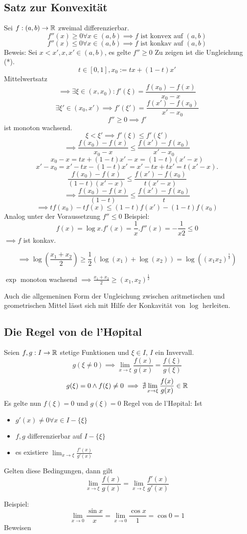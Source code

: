 \documentclass[a4paper]{article}
\begin{document}
\subsection*{Satz zur Konvexität}
Sei $f: (a, b) \to \Bbb R$ zweimal differenzierbar.
$$f''(x) \geq 0 \forall x \in (a, b) \implies f \text{ ist konvex auf } (a, b)$$
$$f''(x) \leq 0 \forall x \in (a, b) \implies f \text{ ist konkav auf } (a, b)$$
Beweis: Sei $x< x', x, x' \in (a, b)$, es gelte $f'' \geq 0$
Zu zeigen ist die Ungleichung (*).
$$t \in [0, 1], x_0 := tx + (1-t)x'$$
Mittelwertsatz
$$\implies \exists \xi \in (x, x_0) : f'(\xi) = \frac{f(x_0) - f(x)}{x_0 - x}$$
$$\exists \xi' \in (x_0, x') \implies f'(\xi') = \frac{f(x') - f(x_0)}{x' - x_0}$$
$$f'' \geq 0 \implies f'$$ ist monoton wachsend.
$$\xi < \xi' \implies f'(\xi) \leq f'(\xi')$$
$$ \implies \frac{f(x_0) - f(x)}{x_0 - x} \leq \frac{f(x') - f(x_0)}{x' - x_0}$$
$$ x_0 - x = tx + (1-t)x' - x = (1-t)(x'-x)$$
$$x' - x_0 = x' - tx - (1-t)x' = x' - tx + tx' = t(x' - x).$$
$$\frac{f(x_0)-f(x)}{(1-t)(x'-x)} \leq \frac{f(x') - f(x_0)}{t(x'-x)}$$
$$\implies \frac{f(x_0)-f(x)}{(1-t)} \leq \frac{f(x') - f(x_0)}{t}$$
$$\implies tf(x_0) - tf(x) \leq (1-t)f(x') - (1-t)f(x_0)$$
Analog unter der Voraussetzung $f'' \leq 0$
Beispiel:
$$ f(x) = \log x. f'(x) = \frac 1x. f''(x) = -\frac{1}{x2} \leq 0$$
$\implies f$ ist konkav.

$$\implies \log (\frac{x_1 + x_2}{2}) \geq \frac 12(\log(x_1) + \log(x_2)) = \log ((x_1 x_2)^{\frac 12})$$

$\exp$ monoton wachsend $\implies \frac{x_1 + x_2}{2} \geq (x_1, x_2)^{\frac 12}$

Auch die allgemeninen Form der Ungleichung zwischen aritmetischen und geometrischen Mittel lässt sich mit Hilfe der Konkavität von $\log$ herleiten.

\subsection{Die Regel von de l'Høpital}
Seien $f, g: I \to \Bbb R$ stetige Funktionen und $\xi \in I$, $I$ ein Invervall.
$$g(\xi \neq 0) \implies \lim_{x \to \xi} \frac{f(x)}{g(x)} = \frac{f(\xi)}{g(\xi)}$$
$$g(\xi) = 0 \wedge f(\xi) \neq 0 \implies \nexists \lim_{x \to \xi} \frac{f(x)}{g(x)} \in \Bbb R$$
Es gelte nun $f(\xi) = 0$ und $g(\xi) = 0$
Regel von de l'Høpital: Ist
\begin{itemize}
\item $g'(x) \neq 0 \forall x \in I - \{\xi\}$
  \item $f, g$ differenzierbar auf $I - \{\xi\}$
    \item es existiere $\displaystyle \lim_{x \to \xi} \frac{f'(x)}{g'(x)}$
\end{itemize}
Gelten diese Bedingungen, dann gilt
$$ \lim_{x \to \xi}  \frac{f(x)}{g(x)} = \lim_{x \to \xi}  \frac{f'(x)}{g'(x)}$$

Beispiel:
$$\lim_{x \to 0} \frac{\sin x}x = \lim_{x \to 0} \frac{\cos x}1 = \cos 0 = 1$$
Beweisen
\end{document}

